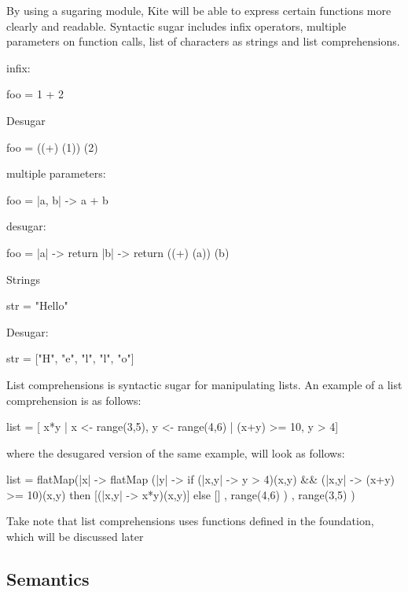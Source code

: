 By using a sugaring module, Kite will be able to express certain
functions more clearly and readable. Syntactic sugar includes infix
operators, multiple parameters on function calls, list of characters
as strings and list comprehensions.

infix:
\begin{kite}
  
  foo = 1 + 2
\end{kite}

Desugar

\begin{kite}

  foo = ((+) (1)) (2)
\end{kite}

multiple parameters:
\begin{kite}
  
  foo = |a, b| -> {
    a + b
  }
\end{kite}
desugar:

\begin{kite}

  foo = |a| -> {
    return |b| -> {
      return ((+) (a)) (b)
    }
  }
\end{kite}
Strings 
\begin{kite}
  
  str = "Hello"
\end{kite}
Desugar:
\begin{kite}
  
  str = ["H", "e", "l", "l", "o"]
\end{kite}


List comprehensions is syntactic sugar for manipulating
lists. An example of a list comprehension is as follows:
\begin{kite}
  
  list = [ x*y | x <- range(3,5), y <- range(4,6) | (x+y) >= 10, y > 4]
\end{kite}
where the desugared version of the same example, will look as follows:
\begin{kite}

  list =
  flatMap(|x| -> {
    flatMap (|y| -> {
      if (|x,y| -> {y > 4})(x,y) && (|x,y| -> {(x+y) >= 10})(x,y) 
         then [(|x,y| -> {x*y})(x,y)] 
         else []
    } , range(4,6) )
}, range(3,5) )
\end{kite}
Take note that list comprehensions uses functions defined in the
foundation, which will be discussed later
\subsection{Semantics}

